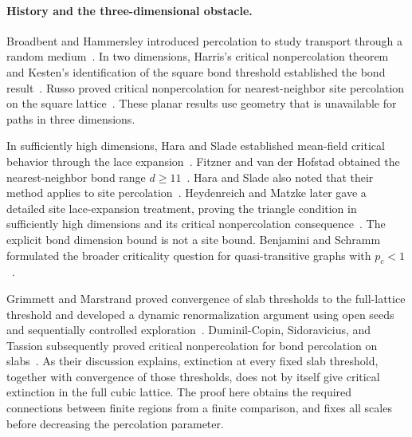 \documentclass[11pt]{article}
\theoremstyle{definition}
\theoremstyle{remark}
\numberwithin{equation}{section}
\begin{document}
\paragraph{History and the three-dimensional obstacle.}
Broadbent and Hammersley introduced percolation to study transport through
a random medium~\cite{BroadbentHammersley1957}. In two dimensions, Harris's
critical nonpercolation theorem and Kesten's identification of the square
bond threshold established the bond result~\cite{Harris1960,Kesten1980}.
Russo proved critical nonpercolation for nearest-neighbor site percolation
on the square lattice~\cite[Theorem~2(b)]{Russo1981}. These planar results
use geometry that is unavailable for paths in three dimensions.

In sufficiently high dimensions, Hara and Slade established mean-field
critical behavior through the lace expansion~\cite{HaraSlade1990}.
Fitzner and van der Hofstad obtained the nearest-neighbor bond range
$d\ge11$~\cite{FitznerHofstad2017}. Hara and Slade also noted that their method applies to site
percolation~\cite[p.~335]{HaraSlade1990}. Heydenreich and Matzke later gave
a detailed site lace-expansion treatment, proving the triangle condition
in sufficiently high dimensions and its critical nonpercolation
consequence~\cite[Theorem~1.1 and Section~1.3]{HeydenreichMatzke2020}. The explicit bond dimension bound is
not a site bound. Benjamini and Schramm formulated the broader criticality
question for quasi-transitive graphs with $p_c<1$~\cite[Conjecture~4]{BenjaminiSchramm1996}.

Grimmett and Marstrand proved convergence of slab thresholds to the
full-lattice threshold and developed a dynamic renormalization argument
using open seeds and sequentially controlled exploration~\cite{GrimmettMarstrand1990}.
Duminil-Copin, Sidoravicius, and Tassion subsequently proved critical
nonpercolation for bond percolation on slabs~\cite{DuminilCopinSidoraviciusTassion2016}.
As their discussion explains, extinction at every fixed slab threshold,
together with convergence of those thresholds, does not by itself give
critical extinction in the full cubic lattice. The proof here obtains the
required connections between finite regions from a finite comparison,
and fixes all scales before decreasing the percolation parameter.
\end{document}
